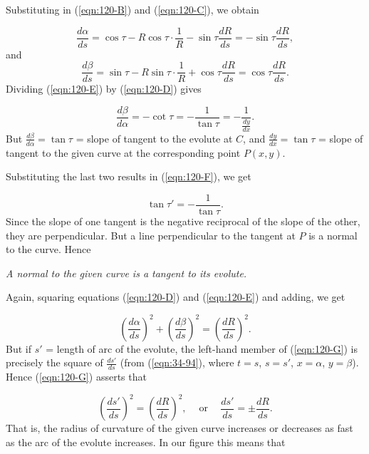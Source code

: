 Substituting in (\ref{eqn:120-B}) and (\ref{eqn:120-C}), we obtain

\begin{equation}
\label{eqn:120-D}
\frac{d\alpha}{ds} 
= \cos \tau - R \cos \tau \cdot \frac{1}{R} - \sin \tau \frac{dR}{ds} 
= - \sin \tau \frac{dR}{ds},
\end{equation}
and
\begin{equation}
\label{eqn:120-E}
\frac{d\beta}{ds} 
= \sin \tau - R \sin \tau \cdot \frac{1}{R} + \cos \tau \frac{dR}{ds} 
= \cos \tau \frac{dR}{ds}.
\end{equation}
Dividing (\ref{eqn:120-E}) by (\ref{eqn:120-D}) gives

\begin{equation}
\label{eqn:120-F}
\frac{d\beta}{d\alpha} 
= - \cot \tau = - \frac{1}{\tan \tau} 
= - \frac{1}{\frac{dy}{dx}}.
\end{equation}
But 
$\frac{d\beta}{d\alpha} = \tan \tau$ = slope of tangent to the 
evolute at $C$, and
$\frac{dy}{dx} = \tan \tau$ = slope of tangent to the given curve 
at the corresponding point $P(x,y)$.

Substituting the last two results in (\ref{eqn:120-F}), we get

\[
    \tan \tau' = - \frac{1}{\tan \tau}.
\]
Since the slope of one tangent is the negative reciprocal 
of the slope of the other, they are perpendicular. But a 
line perpendicular to the tangent at $P$ is a normal to the curve. Hence

{\it A normal to the given curve is a tangent to its evolute.}

Again, squaring equations (\ref{eqn:120-D}) and (\ref{eqn:120-E})
and adding, we get

\begin{equation}
\label{eqn:120-G}
\left( \frac{d\alpha}{ds} \right)^2 + 
\left( \frac{d\beta}{ds} \right)^2 
= \left( \frac{dR}{ds} \right)^2.
\end{equation}
But if $s'$ = length of arc of the evolute, the left-hand member 
of (\ref{eqn:120-G}) is precisely the square of $\frac{ds'}{ds}$ 
(from (\ref{eqn:34-94}), %
where $t = s$, $s = s'$, $x = \alpha$, $y = \beta$). 
Hence (\ref{eqn:120-G}) asserts that

\[
  \left( \frac{ds'}{ds} \right)^2 
= \left( \frac{dR}{ds} \right)^2, \ \ \ \ 
\text{ or } \ \ \ \ 
\frac{ds'}{ds} = \pm \frac{dR}{ds}.
\]
That is, the radius of curvature of the given curve increases or 
decreases as fast as the arc of the evolute increases. In our 
figure this means that

